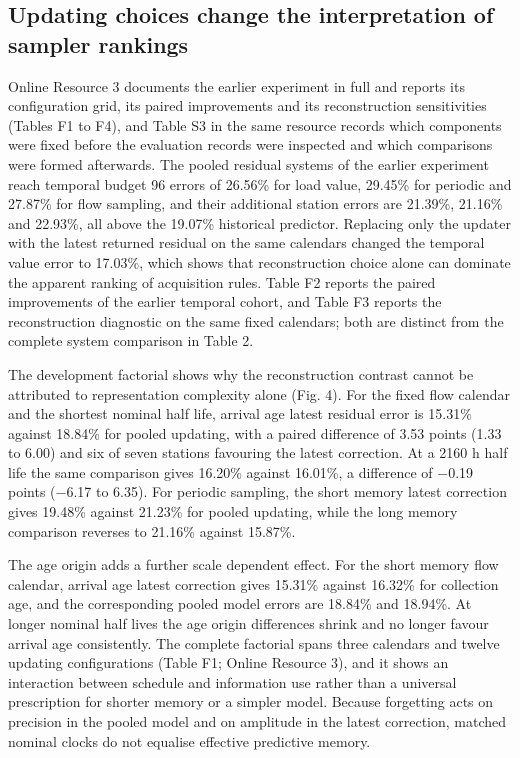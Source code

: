 \documentclass[pdflatex,sn-mathphys-num]{sn-jnl}%
\theoremstyle{thmstyleone}%
\theoremstyle{thmstyletwo}%
\theoremstyle{thmstylethree}%
\begin{document}
\subsection{Updating choices change the interpretation of sampler rankings}

Online Resource 3 documents the earlier experiment in full and reports its configuration grid, its paired improvements and its reconstruction sensitivities (Tables F1 to F4), and Table S3 in the same resource records which components were fixed before the evaluation records were inspected and which comparisons were formed afterwards. The pooled residual systems of the earlier experiment reach temporal budget 96 errors of 26.56\% for load value, 29.45\% for periodic and 27.87\% for flow sampling, and their additional station errors are 21.39\%, 21.16\% and 22.93\%, all above the 19.07\% historical predictor. Replacing only the updater with the latest returned residual on the same calendars changed the temporal value error to 17.03\%, which shows that reconstruction choice alone can dominate the apparent ranking of acquisition rules. Table F2 reports the paired improvements of the earlier temporal cohort, and Table F3 reports the reconstruction diagnostic on the same fixed calendars; both are distinct from the complete system comparison in Table 2.

The development factorial shows why the reconstruction contrast cannot be attributed to representation complexity alone (Fig. 4). For the fixed flow calendar and the shortest nominal half life, arrival age latest residual error is 15.31\% against 18.84\% for pooled updating, with a paired difference of 3.53 points (1.33 to 6.00) and six of seven stations favouring the latest correction. At a 2160 h half life the same comparison gives 16.20\% against 16.01\%, a difference of $-$0.19 points ($-$6.17 to 6.35). For periodic sampling, the short memory latest correction gives 19.48\% against 21.23\% for pooled updating, while the long memory comparison reverses to 21.16\% against 15.87\%.

The age origin adds a further scale dependent effect. For the short memory flow calendar, arrival age latest correction gives 15.31\% against 16.32\% for collection age, and the corresponding pooled model errors are 18.84\% and 18.94\%. At longer nominal half lives the age origin differences shrink and no longer favour arrival age consistently. The complete factorial spans three calendars and twelve updating configurations (Table F1; Online Resource 3), and it shows an interaction between schedule and information use rather than a universal prescription for shorter memory or a simpler model. Because forgetting acts on precision in the pooled model and on amplitude in the latest correction, matched nominal clocks do not equalise effective predictive memory.
\end{document}
